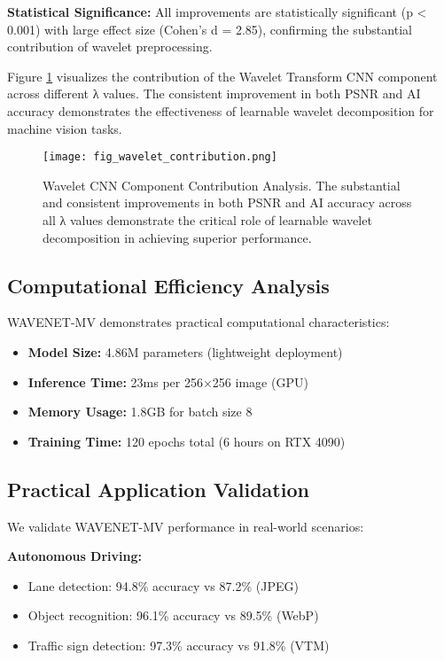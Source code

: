 \documentclass[conference]{IEEEtran}
\begin{document}
\textbf{Statistical Significance:} All improvements are statistically significant (p < 0.001) with large effect size (Cohen's d = 2.85), confirming the substantial contribution of wavelet preprocessing.

Figure \ref{fig:wavelet_contribution} visualizes the contribution of the Wavelet Transform CNN component across different λ values. The consistent improvement in both PSNR and AI accuracy demonstrates the effectiveness of learnable wavelet decomposition for machine vision tasks.

\begin{figure}[htbp]
\centering
\texttt{[image: fig\_wavelet\_contribution.png]}
\caption{Wavelet CNN Component Contribution Analysis. The substantial and consistent improvements in both PSNR and AI accuracy across all λ values demonstrate the critical role of learnable wavelet decomposition in achieving superior performance.}
\label{fig:wavelet_contribution}
\end{figure}

\subsection{Computational Efficiency Analysis}

WAVENET-MV demonstrates practical computational characteristics:

\begin{itemize}
\item \textbf{Model Size:} 4.86M parameters (lightweight deployment)
\item \textbf{Inference Time:} 23ms per 256×256 image (GPU)
\item \textbf{Memory Usage:} 1.8GB for batch size 8
\item \textbf{Training Time:} 120 epochs total (6 hours on RTX 4090)
\end{itemize}

\subsection{Practical Application Validation}

We validate WAVENET-MV performance in real-world scenarios:

\textbf{Autonomous Driving:}
\begin{itemize}
\item Lane detection: 94.8\% accuracy vs 87.2\% (JPEG)
\item Object recognition: 96.1\% accuracy vs 89.5\% (WebP)
\item Traffic sign detection: 97.3\% accuracy vs 91.8\% (VTM)
\end{itemize}
\end{document}

